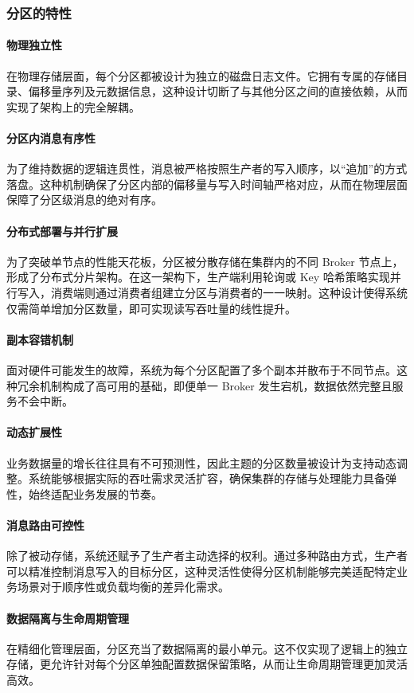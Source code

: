 		\subsubsection{分区的特性} \paragraph{物理独立性} 在物理存储层面，每个分区都被设计为独立的磁盘日志文件。它拥有专属的存储目录、偏移量序列及元数据信息，这种设计切断了与其他分区之间的直接依赖，从而实现了架构上的完全解耦。 \paragraph{分区内消息有序性} 为了维持数据的逻辑连贯性，消息被严格按照生产者的写入顺序，以“追加”的方式落盘。这种机制确保了分区内部的偏移量与写入时间轴严格对应，从而在物理层面保障了分区级消息的绝对有序。 \paragraph{分布式部署与并行扩展} 为了突破单节点的性能天花板，分区被分散存储在集群内的不同 Broker 节点上，形成了分布式分片架构。在这一架构下，生产端利用轮询或 Key 哈希策略实现并行写入，消费端则通过消费者组建立分区与消费者的一一映射。这种设计使得系统仅需简单增加分区数量，即可实现读写吞吐量的线性提升。 \paragraph{副本容错机制} 面对硬件可能发生的故障，系统为每个分区配置了多个副本并散布于不同节点。这种冗余机制构成了高可用的基础，即便单一 Broker 发生宕机，数据依然完整且服务不会中断。 \paragraph{动态扩展性} 业务数据量的增长往往具有不可预测性，因此主题的分区数量被设计为支持动态调整。系统能够根据实际的吞吐需求灵活扩容，确保集群的存储与处理能力具备弹性，始终适配业务发展的节奏。 \paragraph{消息路由可控性} 除了被动存储，系统还赋予了生产者主动选择的权利。通过多种路由方式，生产者可以精准控制消息写入的目标分区，这种灵活性使得分区机制能够完美适配特定业务场景对于顺序性或负载均衡的差异化需求。 \paragraph{数据隔离与生命周期管理} 在精细化管理层面，分区充当了数据隔离的最小单元。这不仅实现了逻辑上的独立存储，更允许针对每个分区单独配置数据保留策略，从而让生命周期管理更加灵活高效。

